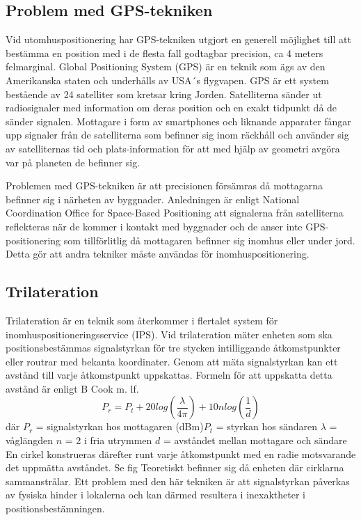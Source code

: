 \documentclass[swedish, a4paper,12pt]{article}
\begin{document}
\subsection{Problem med GPS-tekniken}
Vid utomhuspositionering har GPS-tekniken utgjort en generell möjlighet till att bestämma en position med i de flesta fall godtagbar precision, ca 4 meters felmarginal\cite{GPS_US_ACCURACY}.
Global Positioning System (GPS) är en teknik som ägs av den Amerikanska staten och underhålls av USA´s flygvapen. GPS är ett system bestående av 24 satelliter som kretsar kring Jorden. Satelliterna sänder ut radiosignaler med information om deras position och en exakt tidpunkt då de sänder signalen. Mottagare i form av smartphones och liknande apparater fångar upp signaler från de satelliterna som befinner sig inom räckhåll och använder sig av satelliternas tid och plats-information för att med hjälp av geometri avgöra var på planeten de befinner sig.\cite{GPS_US_HOW}

Problemen med GPS-tekniken är att precisionen försämras då mottagarna befinner sig i närheten av byggnader. Anledningen är enligt National Coordination Office for Space-Based Positioning att signalerna från satelliterna reflekteras när de kommer i kontakt med byggnader och de anser inte GPS-positionering som tillförlitlig då mottagaren befinner sig inomhus eller under jord.\cite{GPS_US_ACCURACY} Detta gör att andra tekniker måste användas för inomhuspositionering.
\iffalse
\subsection{Trilateration}
Trilateration är en teknik som återkommer i flertalet system för inomhuspositioneringsservice (IPS). Vid trilateration mäter enheten som ska positionsbestämmas signalstyrkan för tre stycken intilliggande åtkomstpunkter eller routrar med bekanta koordinater. Genom att mäta signalstyrkan kan ett avstånd till varje åtkomstpunkt uppskattas. Formeln för att uppskatta detta avstånd är enligt B Cook m. lf.\cite{cook2005indoor}
\newline
$$ P_r = P_t + 20log(\frac{\lambda}{4\pi}) + 10nlog(\frac{1}{d})$$
där
$  P_r $ = signalstyrkan hos mottagaren (dBm)\newline $P_t$ = styrkan hos sändaren\newline
$\lambda$ = våglängden\newline
$ n $ = 2 i fria utrymmen\newline
$ d $ = avståndet mellan mottagare och sändare
\bigskip
\newline
En cirkel konstrueras därefter runt varje åtkomstpunkt med en radie motsvarande det uppmätta avståndet. Se fig %
Teoretiskt befinner sig då enheten där cirklarna sammanstrålar. Ett problem med den här tekniken är att signalstyrkan påverkas av fysiska hinder i lokalerna och kan därmed resultera i inexaktheter i positionsbestämningen.
\end{document}
